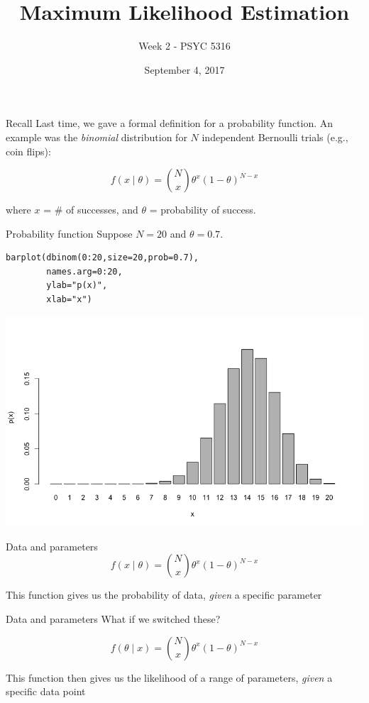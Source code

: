 \documentclass[presentation]{beamer}
\author{Week 2 - PSYC 5316}
\date{September 4, 2017}
\title{Maximum Likelihood Estimation}
\begin{document}
\maketitle

\begin{frame}[label=sec-1]{Recall}
Last time, we gave a formal definition for a \alert{probability function}.  An example was the \emph{binomial} distribution for $N$ independent Bernoulli trials (e.g., coin flips):

\[
f(x\mid \theta) = {N\choose x} \theta^x(1-\theta)^{N-x}
\]

where $x$ = \# of successes, and $\theta$ = probability of success.
\end{frame}

\begin{frame}[fragile,label=sec-2]{Probability function}
 Suppose $N=20$ and $\theta=0.7$.  

\begin{verbatim}
barplot(dbinom(0:20,size=20,prob=0.7),
        names.arg=0:20,
        ylab="p(x)",
        xlab="x")
\end{verbatim}

\includegraphics[width=.9\linewidth]{figures/week2/binom.png}
\end{frame}

\begin{frame}[label=sec-3]{Data and parameters}
\[
f(x\mid \theta) = {N\choose x} \theta^x(1-\theta)^{N-x}
\]

\vspace{1cm}

This function gives us the probability of \alert{data}, \emph{given} a specific \alert{parameter}
\end{frame}


\begin{frame}[label=sec-4]{Data and parameters}
What if we switched these?

\[
f(\theta \mid x) = {N\choose x} \theta^x(1-\theta)^{N-x}
\]

\vspace{1cm}

This function then gives us the likelihood of a range of \alert{parameters}, \emph{given} a specific \alert{data point}
\end{frame}
\end{document}
